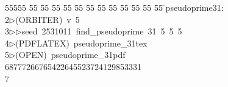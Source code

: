 %
%
\begin{tabbing}
55555 \= 55 \= 55 \= 55 \= 55 \= 55 \= 55 \= 55 \= 55 \= 55 \= 55 \= 55 \= 55 \= \>pseudoprime31:\\[0pt]
2\>$\triangleright$\>(ORBITER)\ v\ 5\ \\[0pt]
3\>$\triangleright$\>$\triangleright$\>seed\ 2531011\ find\_pseudoprime\ 31\ 5\ 5\ 5\ \\[0pt]
4\>$\triangleright$\>(PDFLATEX)\ pseudoprime\_31tex\\[0pt]
5\>$\triangleright$\>(OPEN)\ pseudoprime\_31pdf\\[0pt]
6\>8777266765422645523724129853331\\[0pt]
7\>\end{tabbing}
